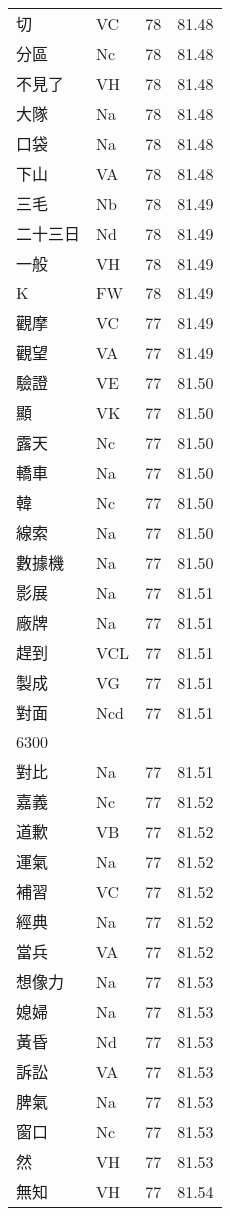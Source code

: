 \documentclass[twocolumn]{book}
\begin{document}
\begin{supertabular}{llrr}
切 & VC & 78 &  81.48\\
分區 & Nc & 78 &  81.48\\
不見了 & VH & 78 &  81.48\\
大隊 & Na & 78 &  81.48\\
口袋 & Na & 78 &  81.48\\
下山 & VA & 78 &  81.48\\
三毛 & Nb & 78 &  81.49\\
二十三日 & Nd & 78 &  81.49\\
一般 & VH & 78 &  81.49\\
K & FW & 78 &  81.49\\
觀摩 & VC & 77 &  81.49\\
觀望 & VA & 77 &  81.49\\
驗證 & VE & 77 &  81.50\\
顯 & VK & 77 &  81.50\\
露天 & Nc & 77 &  81.50\\
轎車 & Na & 77 &  81.50\\
韓 & Nc & 77 &  81.50\\
線索 & Na & 77 &  81.50\\
數據機 & Na & 77 &  81.50\\
影展 & Na & 77 &  81.51\\
廠牌 & Na & 77 &  81.51\\
趕到 & VCL & 77 &  81.51\\
製成 & VG & 77 &  81.51\\
對面 & Ncd & 77 &  81.51\\
6300\\
對比 & Na & 77 &  81.51\\
嘉義 & Nc & 77 &  81.52\\
道歉 & VB & 77 &  81.52\\
運氣 & Na & 77 &  81.52\\
補習 & VC & 77 &  81.52\\
經典 & Na & 77 &  81.52\\
當兵 & VA & 77 &  81.52\\
想像力 & Na & 77 &  81.53\\
媳婦 & Na & 77 &  81.53\\
黃昏 & Nd & 77 &  81.53\\
訴訟 & VA & 77 &  81.53\\
脾氣 & Na & 77 &  81.53\\
窗口 & Nc & 77 &  81.53\\
然 & VH & 77 &  81.53\\
無知 & VH & 77 &  81.54\\

\end{supertabular}
\end{document}
